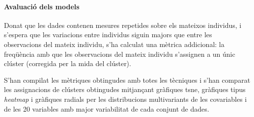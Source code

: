 \documentclass[CAT,BIB]{TFUOC}%
\begin{document}
            \paragraph{Avaluació dels models}
                Donat que les dades contenen mesures repetides sobre els mateixos individus,
                i s'espera que les variacions entre individus siguin majors
                que entre les observacions del mateix individu,
                s'ha calculat una mètrica addicional:
                la freqüència amb que les observacions del mateix individu
                s'assignen a un únic clúster (corregida per la mida del clúster).

                S'han compilat les mètriques obtingudes amb totes les tècniques
                i s'han comparat les assignacions de clústers obtingudes
                mitjançant gràfiques \gls{tsne},
                gràfiques tipus \textit{heatmap}
                i gràfiques radials per les distribucions multivariants
                de les covariables
                i de les 20 variables amb major variabilitat de cada conjunt de dades.
\end{document}
